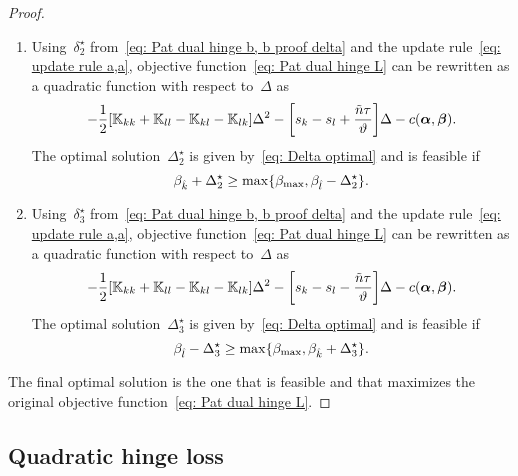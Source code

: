 \begin{proof}
\begin{enumerate}
    \item Using~$\delta^{\star}_2$ from~\eqref{eq: Pat dual hinge b, b proof delta} and the update rule~\eqref{eq: update rule a,a}, objective function~\eqref{eq: Pat dual hinge L} can be rewritten as a quadratic function with respect to~$\Delta$ as
    \begin{equation*}
      - \frac{1}{2} \Brac[s]{\K_{kk} + \K_{ll} - \K_{kl} - \K_{lk}} \Delta^2
      - \Brac[s]{s_k - s_l + \frac{\ntil \tau}{\vartheta}} \Delta
      - c(\bm{\alpha}, \bm{\beta}).
    \end{equation*}
    The optimal solution~$\Delta^{\star}_2$ is given by~\eqref{eq: Delta optimal} and is feasible if
    \begin{equation*}
      \beta_{\hat{k}} + \Delta^{\star}_2 \geq \max\{\beta_{\max} , \beta_{\hat{l}} - \Delta^{\star}_2\}.
    \end{equation*}

    \item Using~$\delta^{\star}_3$ from~\eqref{eq: Pat dual hinge b, b proof delta} and the update rule~\eqref{eq: update rule a,a}, objective function~\eqref{eq: Pat dual hinge L} can be rewritten as a quadratic function with respect to~$\Delta$ as
    \begin{equation*}
      - \frac{1}{2} \Brac[s]{\K_{kk} + \K_{ll} - \K_{kl} - \K_{lk}} \Delta^2
      - \Brac[s]{s_k - s_l - \frac{\ntil \tau}{\vartheta}} \Delta
      - c(\bm{\alpha}, \bm{\beta}).
    \end{equation*}
    The optimal solution~$\Delta^{\star}_3$ is given by~\eqref{eq: Delta optimal} and is feasible if
    \begin{equation*}
      \beta_{\hat{l}} - \Delta^{\star}_3 \geq \max\{\beta_{\max}, \beta_{\hat{k}} + \Delta^{\star}_3\}.
    \end{equation*}
  \end{enumerate}
  The final optimal solution is the one that is feasible and that maximizes the original objective function~\eqref{eq: Pat dual hinge L}.
\end{proof}

\subsection*{Quadratic hinge loss}

